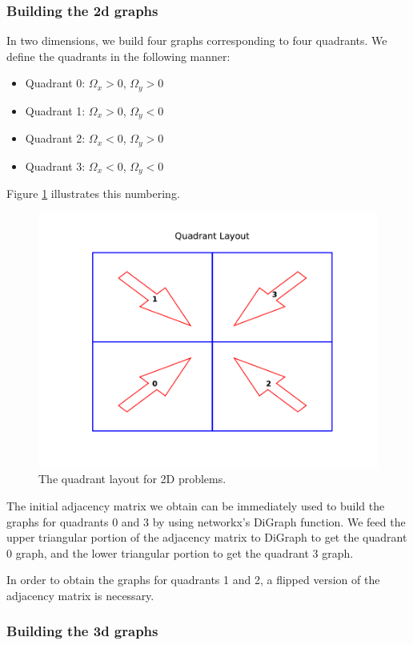 \subsubsection{Building the 2d graphs}
In two dimensions, we build four graphs corresponding to four quadrants. 
We define the quadrants in the following manner:
\begin{itemize}
  \item Quadrant 0: $\Omega_x > 0$, $\Omega_y > 0$
  \item Quadrant 1: $\Omega_x > 0$, $\Omega_y < 0$
  \item Quadrant 2: $\Omega_x < 0$, $\Omega_y > 0$
  \item Quadrant 3: $\Omega_x < 0$, $\Omega_y < 0$
\end{itemize}
Figure \ref{quadrant_layout} illustrates this numbering.
\begin{figure}[H]
\centering
\includegraphics{figures/quadrant_layout.pdf}
\caption{The quadrant layout for 2D problems.}
\label{quadrant_layout}
\end{figure}
The initial adjacency matrix we obtain can be immediately used to build the graphs for quadrants 0 and 3 by using networkx's DiGraph function.
We feed the upper triangular portion of the adjacency matrix to DiGraph to get the quadrant 0 graph, and the lower triangular portion to get the quadrant 3 graph.

In order to obtain the graphs for quadrants 1 and 2, a flipped version of the adjacency matrix is necessary.

\subsubsection{Building the 3d graphs}


